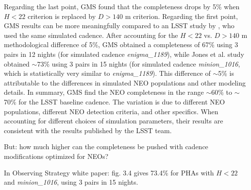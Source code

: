 \documentclass[12pt,preprint]{aastex}
\begin{document}
Regarding the last point, GMS found that the completeness drops by 5\%
when $H<22$ criterion is replaced by $D>140$ m criterion. Regarding 
the first point, GMS results can be more meaningfully compared to an LSST
study by \cite{JJI2016}, who used the same simulated cadence. After accounting for 
the $H<22$ vs. $D>140$ m methodological difference of 5\%, GMS obtained a 
completeness of 67\% using 3 pairs in 12 nights (for simulated cadence {\it enigma\_1189}), while Jones et al. 
study obtained $\sim$73\% using 3 pairs in 15 nights (for simulated cadence {\it minion\_1016}, which is 
statistically very similar to {\it enigma\_1189}). This difference 
of $\sim$5\% is attributable to the differences in simulated NEO
populations and other modeling details. In summary, GMS find the NEO
completeness in the range $\sim$60\% to $\sim$70\% for the LSST
baseline cadence. The variation is due to different NEO populations,
different NEO detection criteria, and other specifics. When accounting 
for different choices of simulation parameters, their results are
consistent with the results published by the LSST team. 

But: how much higher can the completeness be pushed with cadence
modifications optimized for NEOs? 

In Observing Strategy white paper: fig. 3.4 gives 73.4\% for PHAs with 
$H<22$ and {\it minion\_1016}, using 3 pairs in 15 nights. 



\appendix




\end{document}
